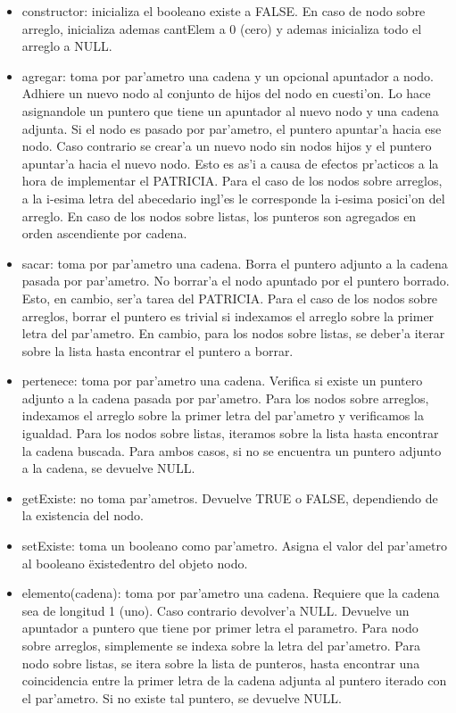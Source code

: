 \begin{itemize}
\item constructor: inicializa el booleano existe a FALSE. En caso de nodo sobre arreglo, inicializa ademas cantElem a 0 (cero) y ademas inicializa todo el arreglo a NULL.

\item agregar: toma por par'ametro una cadena y un opcional apuntador a nodo. Adhiere un nuevo nodo al conjunto de hijos del nodo en cuesti'on. Lo hace asignandole un puntero que tiene un apuntador al nuevo nodo y una cadena adjunta. Si el nodo es pasado por par'ametro, el puntero apuntar'a hacia ese nodo. Caso contrario se crear'a un nuevo nodo sin nodos hijos y el puntero apuntar'a hacia el nuevo nodo. Esto es as'i a causa de efectos pr'acticos a la hora de implementar el PATRICIA. Para el caso de los nodos sobre arreglos, a la i-esima letra del abecedario ingl'es le corresponde la i-esima posici'on del arreglo. En caso de los nodos sobre listas, los punteros son agregados en orden ascendiente por cadena.

\item sacar: toma por par'ametro una cadena. Borra el puntero adjunto a la cadena pasada por par'ametro. No borrar'a el nodo apuntado por el puntero borrado. Esto, en cambio, ser'a tarea del PATRICIA. Para el caso de los nodos sobre arreglos, borrar el puntero es trivial si indexamos el arreglo  sobre la primer letra del par'ametro. En cambio, para los nodos sobre listas, se deber'a iterar sobre la lista hasta encontrar el puntero a borrar.

\item pertenece: toma por par'ametro una cadena. Verifica si existe un puntero adjunto a la cadena pasada por par'ametro. Para los nodos sobre arreglos, indexamos el arreglo sobre la primer letra del par'ametro y verificamos la igualdad. Para los nodos sobre listas, iteramos sobre la lista hasta encontrar la cadena buscada. Para ambos casos, si no se encuentra un puntero adjunto a la cadena, se devuelve NULL.

\item getExiste: no toma par'ametros. Devuelve TRUE o FALSE, dependiendo de la existencia del nodo.

\item setExiste: toma un booleano como par'ametro. Asigna el valor del par'ametro al booleano \"existe\" dentro del objeto nodo. 

\item elemento(cadena): toma por par'ametro una cadena. Requiere que la cadena sea de longitud 1 (uno). Caso contrario devolver'a NULL. Devuelve un apuntador a puntero que tiene por primer letra el parametro. Para nodo sobre arreglos, simplemente se indexa sobre la letra del par'ametro. Para nodo sobre listas, se itera sobre la lista de punteros, hasta encontrar una coincidencia entre la primer letra de la cadena adjunta al puntero iterado con el par'ametro. Si no existe tal puntero, se devuelve NULL.


\end{itemize}
